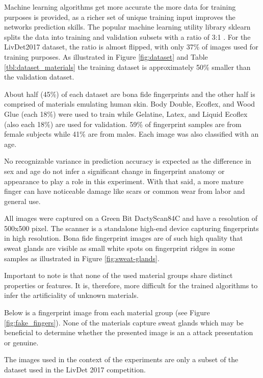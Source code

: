 



Machine learning algorithms get more accurate the more data for training purposes is provided, as a richer set of unique training input improves the networks prediction skills.
The popular machine learning utility library \gls{sklearn} splits the data into training and validation subsets with a ratio of 3:1 \cite{sklearn}.
For the LivDet2017 dataset, the ratio is almost flipped, with only 37\% of images used for training purposes.
As illustrated in Figure \ref{fig:dataset} and Table \ref{tbl:dataset_materials} the training dataset is approximately 50\% smaller than the validation dataset.

About half (45\%) of each dataset are bona fide fingerprints and the other half is comprised of materials emulating human skin.
Body Double, Ecoflex, and Wood Glue (each 18\%) were used to train while Gelatine, Latex, and Liquid Ecoflex (also each 18\%) are used for validation.
59\% of fingerprint samples are from female subjects while 41\% are from males.
Each image was also classified with an age.






No recognizable variance in prediction accuracy is expected as the difference in sex and age do not infer a significant change in fingerprint anatomy or appearance to play a role in this experiment.
With that said, a more mature finger can have noticeable damage like scars or common wear from labor and general use.

All images were captured on a Green Bit DactyScan84C and have a resolution of 500x500 pixel.
The scanner is a standalone high-end device capturing fingerprints in high resolution.
Bona fide fingerprint images are of such high quality that sweat glands are visible as small white spots on fingerprint ridges in some samples as illustrated in Figure \ref{fig:sweat-glands}.

Important to note is that none of the used material groups share distinct properties or features.
It is, therefore, more difficult for the trained algorithms to infer the artificiality of unknown materials.

Below is a fingerprint image from each material group (see Figure \ref{fig:fake_fingers}).
None of the materials capture sweat glands which may be beneficial to determine whether the presented image is an a attack presentation or genuine.

The images used in the context of the experiments are only a subset of the dataset used in the LivDet 2017 competition.

